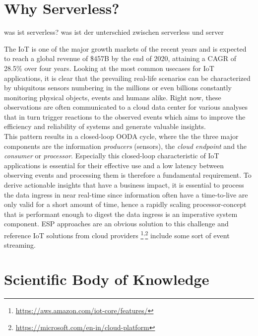 \section{Why Serverless?}


was ist serverless? was ist der unterschied zwischen serverless und server

The \acf{IoT} is one of the major growth markets of the recent years and is expected to reach a global revenue of \$457B by the end of 2020, attaining a \acf{CAGR} of 28.5\% over four years.\autocite{Columbus20172017Forecasts} Looking at the most common usecases for IoT applications, it is clear that the prevailing real-life scenarios can be characterized by ubiquitous sensors numbering in the millions or even billions constantly monitoring physical objects, events and humans alike. Right now, these observations are often communicated to a cloud data center for various analyses that in turn trigger reactions to the observed events which aims to improve the efficiency and reliability of systems and generate valuable insights.\autocite{Yannuzzi2014KeyComputing} \\
This pattern results in a closed-loop \acf{OODA} cycle, where the the three major components are the information \textit{producers} (sensors), the \textit{cloud endpoint} and the \textit{consumer} or \textit{processor}.\autocite{Shukla2017BenchmarkingApplications} Especially this closed-loop characteristic of IoT applications is essential for their effective use and a low latency between observing events and processing them is therefore a fundamental requirement. To derive actionable insights that have a business impact, it is essential to process the data ingress in near real-time since information often have a time-to-live are only valid for a short amount of time, hence a rapidly scaling processor-concept that is performant enough to digest the data ingress is an imperative system component. \acf{ESP} approaches are an obvious solution to this challenge and reference IoT solutions from cloud providers \footnote{\url{https://aws.amazon.com/iot-core/features/}}\textsuperscript{,}\footnote{\url{https://microsoft.com/en-in/cloud-platform}} include some sort of event streaming.


\section{Scientific Body of Knowledge}



